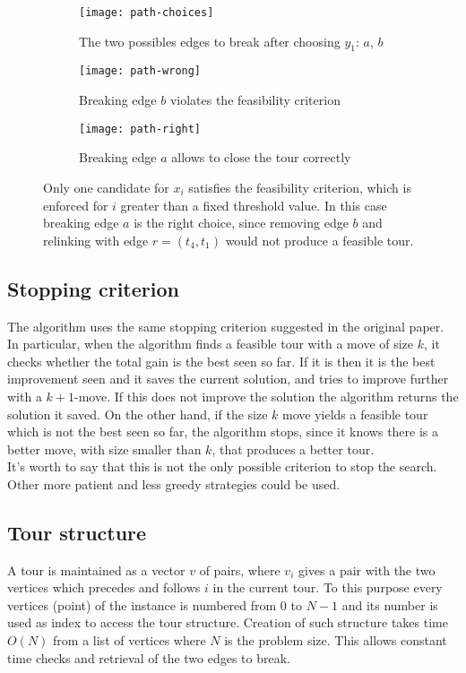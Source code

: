 \begin{figure}[h]
	\centering
	\begin{subfigure}[c]{0.31\textwidth}
		\texttt{[image: path-choices]}
		\caption{The two possibles edges to break after choosing $y_1$: $a$, $b$}
	\end{subfigure}
	\begin{subfigure}[c]{0.31\textwidth}
		\texttt{[image: path-wrong]}
		\caption{Breaking edge $b$ violates the feasibility criterion}
	\end{subfigure}
	\begin{subfigure}[c]{0.31\textwidth}
		\texttt{[image: path-right]}
		\caption{Breaking edge $a$ allows to close the tour correctly}
	\end{subfigure}
	\caption{Only one candidate for $x_i$ satisfies the feasibility criterion, which is enforced for $i$ greater than a fixed threshold value. In this case breaking edge $a$ is the right choice, since removing edge $b$ and relinking with edge $r=(t_4,t_1)$ would not produce a feasible tour.}
	\label{fig:feasibility-moves}
\end{figure}

\subsection{Stopping criterion}
The algorithm uses the same stopping criterion suggested in the original paper. In particular, when the algorithm finds a feasible tour with a move of size $k$, it checks whether the total gain is the best seen so far. If it is then it is the best improvement seen and it saves the current solution, and tries to improve further with a $k+1$-move. If this does not improve the solution the algorithm returns the solution it saved. On the other hand, if the size $k$ move yields a feasible tour which is not the best seen so far, the algorithm stops, since it knows there is a better move, with size smaller than $k$, that produces a better tour.\\
It's worth to say that this is not the only possible criterion to stop the search. Other more patient and less greedy strategies could be used.

\subsection{Tour structure}
A tour is maintained as a vector $v$ of pairs, where $v_i$ gives a pair with the two vertices which precedes and follows $i$ in the current tour. To this purpose every vertices (point) of the instance is numbered from $0$ to $N-1$ and its number is used as index to access the tour structure. Creation of such structure takes time $O(N)$ from a list of vertices where $N$ is the problem size. This allows constant time checks and retrieval of the two edges to break.


